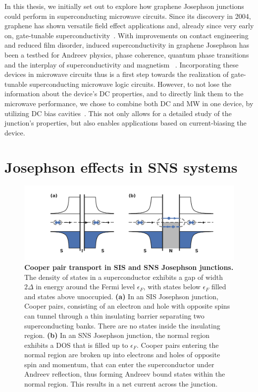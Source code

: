 In this thesis, we initially set out to explore how graphene Josephson junctions could perform in superconducting microwave circuits.
%
Since its discovery in 2004, graphene has shown versatile field effect applications and, already since very early on, gate-tunable superconductivity~\cite{novoselovElectricFieldEffect2004c,heerscheBipolarSupercurrentGraphene2007a}.
%
With improvements on contact engineering and reduced film disorder, induced superconductivity in graphene Josephson has been a testbed for Andreev physics, phase coherence, quantum phase transitions and the interplay of superconductivity and magnetism ~\cite{leeProximityCouplingSuperconductorgraphene2018a}.
%
Incorporating these devices in microwave circuits thus is a first step towards the realization of gate-tunable superconducting microwave logic circuits.
%
However, to not lose the information about the device's DC properties, and to directly link them to the microwave performance, we chose to combine both DC and MW in one device, by utilizing DC bias cavities~\cite{bosmanBroadbandArchitectureGalvanically2015c}.
%
This not only allows for a detailed study of the junction's properties, but also enables applications based on current-biasing the device.







\section{Josephson effects in SNS systems}

\begin{figure}[t]
	\centering
	\includegraphics[width=\linewidth]{chapter-introduction/figs/model_SNS_DOS}
	\caption{
		\textbf{Cooper pair transport in SIS and SNS Josephson junctions.}
		The density of states in a superconductor exhibits a gap of width $2\Delta$ in energy around the Fermi level $\epsilon_F$, with states below $\epsilon_F$ filled and states above unoccupied.
		\textbf{(a)} In an SIS Josephson junction, Cooper pairs, consisting of an electron and hole with opposite spins can tunnel through a thin insulating barrier separating two superconducting banks.
		There are no states inside the insulating region.
		\textbf{(b)} In an SNS Josephson junction, the normal region exhibits a DOS that is filled up to $\epsilon_F$.
		Cooper pairs entering the normal region are broken up into electrons and holes of opposite spin and momentum, that can enter the superconductor under Andreev reflection, thus forming Andreev bound states within the normal region.
		This results in a net current across the junction.
	}
	\label{fig:modelsnsdos}
\end{figure}

